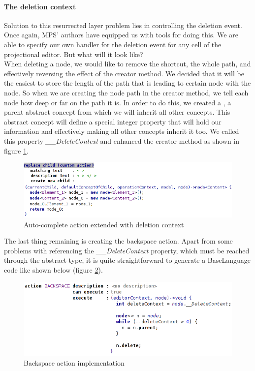 \paragraph {The deletion context}

Solution to this resurrected layer problem lies in controlling the deletion event. Once again, MPS' authors have equipped us with tools for doing this. We are able to specify our own handler for the deletion event for any cell of the projectional editor. But what will it look like?
\\

When deleting a node, we would like to remove the shortcut, the whole path, and effectively reversing the effect of the creator method. We decided that it will be the easiest to store the length of the path that is leading to certain node with the node. So when we are creating the node path in the creator method, we tell each node how deep or far on the path it is. In order to do this, we created a , a parent abstract concept from which we will inherit all other concepts. This abstract concept will define a special integer property that will hold our information and effectively making all other concepts inherit it too. We called this property \textit{{\_}{\_}DeleteContext} and enhanced the creator method as shown in figure \ref{fig:autocomplete_action_delete_context}.

\begin{figure}[h]
	\centering
	\includegraphics[width=\textwidth]{./img/autocomplete_action_delete_context.png}
	\caption{Auto-complete action extended with deletion context}
	\label{fig:autocomplete_action_delete_context}
\end{figure}

The last thing remaining is creating the backspace action. Apart from some problems with referencing the \textit{{\_}{\_}DeleteContext} property, which must be reached through the abstract  type, it is quite straightforward to generate a BaseLanguage code like shown below (figure \ref{fig:backspace_action}).

\begin{figure}[h]
	\centering
	\includegraphics[width=\textwidth]{./img/backspace_action.png}
	\caption{Backspace action implementation}
	\label{fig:backspace_action}
\end{figure}

